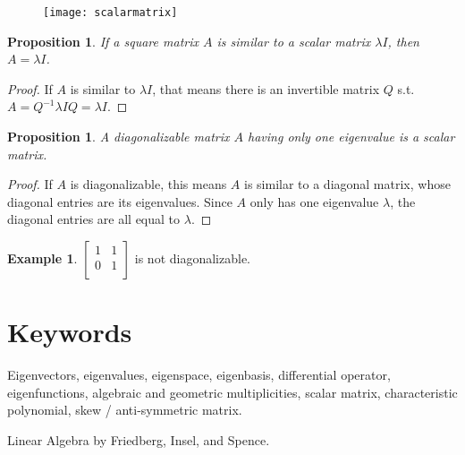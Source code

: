 \documentclass[12pt]{article}
\theoremstyle{plain}
\newtheorem{proposition}[theorem]{Proposition}
\theoremstyle{definition}
\newtheorem{example}[theorem]{Example}
\theoremstyle{remark}
\begin{document}
\begin{figure}[H]
\centering
\texttt{[image: scalarmatrix]}
\end{figure}

\begin{proposition}
If a square matrix $A$ is similar to a scalar matrix $\lambda I$, then $A = \lambda I$.
\end{proposition}

\begin{proof}
If $A$ is similar to $\lambda I$, that means there is an invertible matrix $Q$ s.t. $A = Q^{-1} \lambda I Q = \lambda I$.
\end{proof}

\begin{proposition}
A diagonalizable matrix $A$ having only one eigenvalue is a scalar matrix.
\end{proposition}

\begin{proof}
If $A$ is diagonalizable, this means $A$ is similar to a diagonal matrix, whose diagonal entries are its eigenvalues. Since $A$ only has one eigenvalue $\lambda$, the diagonal entries are all equal to $\lambda$.
\end{proof}

\begin{example}
$\begin{bmatrix}
1 & 1 \\
0 & 1 \\
\end{bmatrix}$ is not diagonalizable.
\end{example}

\section*{Keywords}

Eigenvectors, eigenvalues, eigenspace, eigenbasis, differential operator, eigenfunctions, algebraic and geometric multiplicities, scalar matrix, characteristic polynomial, skew / anti-symmetric matrix.

\begin{thebibliography}{99}

 Linear Algebra by Friedberg, Insel, and Spence.

\end{thebibliography}
\end{document}
